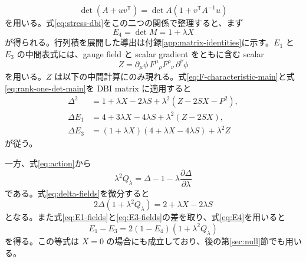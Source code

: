 \documentclass[a4paper,11pt]{ltjsarticle}
\numberwithin{equation}{section}
\begin{document}
\begin{equation}
 \det(A+uv^{\mathsf T})=\det A\left(1+v^{\mathsf T}A^{-1}u\right)
 \label{eq:rank-one-det-main}
\end{equation}
を用いる。式\eqref{eq:stress-dbi}をこの二つの関係で整理すると、まず
\begin{equation}
 E_4=\det M=1+\lambda X
 \label{eq:E4}
\end{equation}
が得られる。行列積を展開した導出は付録\ref{app:matrix-identities}に示す。$E_1$ と $E_3$ の中間表式には、gauge field と scalar gradient をともに含む scalar
\begin{equation}
 Z=\partial_\mu\phi\,F^\mu{}_{\rho}F^\rho{}_{\nu}\,\partial^\nu\phi
 \label{eq:Z-definition}
\end{equation}
を用いる。$Z$ は以下の中間計算にのみ現れる。式\eqref{eq:F-characteristic-main}と式\eqref{eq:rank-one-det-main}を DBI matrix に適用すると
\begin{align}
 \Delta^2
 &=1+\lambda X-2\lambda S
 +\lambda^2\left(Z-2SX-P^2\right),
 \label{eq:delta-fields}\\
 \Delta E_1
 &=4+3\lambda X-4\lambda S+\lambda^2(Z-2SX),
 \label{eq:E1-fields}\\
 \Delta E_3
 &=(1+\lambda X)(4+\lambda X-4\lambda S)+\lambda^2Z
 \label{eq:E3-fields}
\end{align}
が従う。

一方、式\eqref{eq:action}から
\begin{equation}
 \lambda^2Q_\lambda
 =\Delta-1-\lambda\frac{\partial\Delta}{\partial\lambda}
 \label{eq:Q-delta}
\end{equation}
である。式\eqref{eq:delta-fields}を微分すると
\begin{equation}
 2\Delta\left(1+\lambda^2Q_\lambda\right)
 =2+\lambda X-2\lambda S
 \label{eq:Q-field-relation}
\end{equation}
となる。また式\eqref{eq:E1-fields}と\eqref{eq:E3-fields}の差を取り、式\eqref{eq:E4}を用いると
\begin{equation}
 E_1-E_3
 =2(1-E_4)\left(1+\lambda^2Q_\lambda\right)
 \label{eq:undivided-flow}
\end{equation}
を得る。この等式は $X=0$ の場合にも成立しており、後の第\ref{sec:null}節でも用いる。
\end{document}
